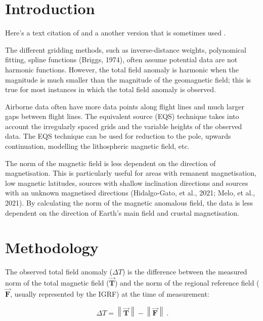 
\section{Introduction}

Here's a text citation of \citet{OliveiraJr2015}
and a another version that is sometimes used \citep{OliveiraJr2015}.

The different gridding methods, such as inverse-distance weights, polynomical fitting, spline functions (Briggs, 1974), often assume potential data are not harmonic functions. However, the total field anomaly is harmonic when the magnitude is much smaller than the magnitude of the geomagnetic field; this is true for most instances in which the total field anomaly is observed. 

Airborne data often have more data points along flight lines and much larger gaps between flight lines. The equivalent source (EQS) technique takes into account the irregularly spaced grids and the variable heights of the observed data. The EQS technique can be used for reduction to the pole, upwards continuation, modelling the lithospheric magnetic field, etc.

The norm of the magnetic field is less dependent on the direction of magnetisation. This is particularly useful for areas with remanent magnetisation, low magnetic latitudes, sources with shallow inclination directions and sources with an unknown magnetised directions (Hidalgo-Gato, et al., 2021; Melo, et al., 2021). By calculating the norm of the magnetic anomalous field, the data is less dependent on the direction of Earth’s main field and crustal magnetisation.

\lipsum[1-3]



\section{Methodology}

The observed total field anomaly ($\Delta T$) is the difference between the measured norm of the total magnetic field ($\vec{\mathbf{T}}$) and the norm of the regional reference field ($\vec{\mathbf{F}}$, usually represented by the IGRF) at the time of measurement:

\begin{equation}
    \Delta T = \left\lVert \vec{\mathbf{T}} \right\rVert - \left\lVert \vec{\mathbf{F}} \right\rVert
    \ .
\end{equation}

